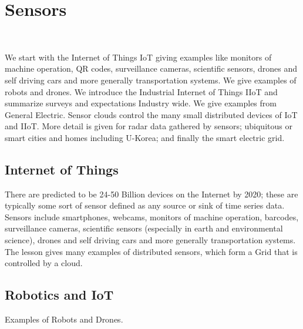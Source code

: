 

\chapter{Sensors}

\FILENAME\

We start with the Internet of Things IoT giving examples like monitors
of machine operation, QR codes, surveillance cameras, scientific
sensors, drones and self driving cars and more generally
transportation systems. We give examples of robots and drones. We
introduce the Industrial Internet of Things IIoT and summarize surveys
and expectations Industry wide. We give examples from General
Electric.  Sensor clouds control the many small distributed devices of
IoT and IIoT. More detail is given for radar data gathered by sensors;
ubiquitous or smart cities and homes including U-Korea; and finally
the smart electric grid.




\section{Internet of Things}\label{internet-of-things}

There are predicted to be 24-50 Billion devices on the Internet by 2020;
these are typically some sort of sensor defined as any source or sink of
time series data. Sensors include smartphones, webcams, monitors of
machine operation, barcodes, surveillance cameras, scientific sensors
(especially in earth and environmental science), drones and self driving
cars and more generally transportation systems. The lesson gives many
examples of distributed sensors, which form a Grid that is controlled by
a cloud.



\section{Robotics and IoT}

Examples of Robots and Drones.



